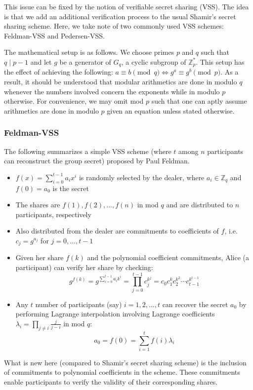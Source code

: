\documentclass[11pt]{article}
\theoremstyle{definition}
\theoremstyle{remark}
\begin{document}
This issue can be fixed by the notion of verifiable secret sharing (VSS). The idea is that we add an additional verification process to the usual Shamir's secret sharing scheme. Here, we take note of two commonly used VSS schemes: Feldman-VSS and Pedersen-VSS.

The mathematical setup is as follows. We choose primes $p$ and $q$ such that $q \mid p - 1$ and let $g$ be a generator of $G_q$, a cyclic subgroup of $\mathbb{Z}^*_p$. This setup has the effect of achieving the following: $a \equiv b \pmod q \iff g^a \equiv g^b \pmod p$. As a result, it should be understood that modular arithmetics are done in modulo $q$ whenever the numbers involved concern the exponents while in modulo $p$ otherwise. For convenience, we may omit mod $p$ such that one can aptly assume arithmetics are done in modulo $p$ given an equation unless stated otherwise.

\subsubsection{Feldman-VSS}
The following summarizes a simple VSS scheme (where $t$ among $n$ participants can reconstruct the group secret) proposed by Paul Feldman.

\begin{itemize}
\item $f(x) = \sum_{i = 0}^{t - 1} a_i x^i$ is randomly selected by the dealer, where $a_i \in \mathbb{Z}_q$ and $f(0) = a_0$ is the secret
\item The shares are $f(1), f(2), ..., f(n)$ in mod $q$ and are distributed to $n$ participants, respectively
\item Also distributed from the dealer are commitments to coefficients of $f$, i.e. $c_j = g^{a_j}$ for $j = 0, ..., t - 1$
\item Given her share $f(k)$ and the polynomial coefficient commitments, Alice (a participant) can verify her share by checking:
$$g^{f(k)} = g^{\sum_{i = 0}^{t - 1} a_i k^i} = \prod_{j = 0}^{t - 1} c_j^{k^j} = c_0 c_1^k c_2^{k^2} \cdots c_{t - 1}^{k^{t - 1}}$$
\item Any $t$ number of participants (say) $i = 1, 2, ..., t$ can recover the secret $a_0$ by performing Lagrange interpolation involving Lagrange coefficients $\lambda_i = \prod_{j \neq i} \frac{j}{j - i}$ in mod $q$:
$$a_0 = f(0) = \sum_{i = 1}^{t} f(i) \lambda_i$$
\end{itemize}

What is new here (compared to Shamir's secret sharing scheme) is the inclusion of commitments to polynomial coefficients in the scheme. These commitments enable participants to verify the validity of their corresponding shares.
\end{document}
